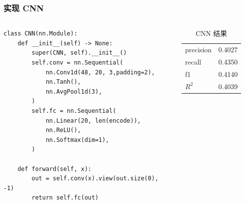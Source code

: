 \documentclass[mathserif,envcountsect,fontset=mac]{ctexbeamer}
\begin{document}
\begin{frame}[fragile]
    \frametitle{实现 CNN}
    \begin{columns}
        \begin{verbatim}
class CNN(nn.Module):
    def __init__(self) -> None:
        super(CNN, self).__init__()
        self.conv = nn.Sequential(
            nn.Conv1d(48, 20, 3,padding=2),
            nn.Tanh(),
            nn.AvgPool1d(3),
        )
        self.fc = nn.Sequential(
            nn.Linear(20, len(encode)),
            nn.ReLU(),
            nn.Softmax(dim=1),
        )

    def forward(self, x):
        out = self.conv(x).view(out.size(0), -1)
        return self.fc(out)
        \end{verbatim}
        \begin{table}
            \caption{CNN 结果}
            \begin{tabular}{ll}
                precision & 0.4027 \\
                recall    & 0.4350 \\
                f1        & 0.4140 \\
                \(R^2\)   & 0.4039 \\
            \end{tabular}
            \label{CNNres}
        \end{table}
    \end{columns}
\end{frame}
\end{document}
